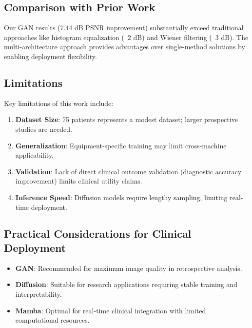 \documentclass[10pt,conference,letterpaper]{IEEEtran}
\begin{document}
\begin{itemize}
\subsection{Comparison with Prior Work}

Our GAN results (7.44 dB PSNR improvement) substantially exceed traditional approaches like histogram equalization (~2 dB) and Wiener filtering (~3 dB). The multi-architecture approach provides advantages over single-method solutions by enabling deployment flexibility.

\subsection{Limitations}

Key limitations of this work include:

\begin{enumerate}
  \item \textbf{Dataset Size}: 75 patients represents a modest dataset; larger prospective studies are needed.
  
  \item \textbf{Generalization}: Equipment-specific training may limit cross-machine applicability.
  
  \item \textbf{Validation}: Lack of direct clinical outcome validation (diagnostic accuracy improvement) limits clinical utility claims.
  
  \item \textbf{Inference Speed}: Diffusion models require lengthy sampling, limiting real-time deployment.
\end{enumerate}

\subsection{Practical Considerations for Clinical Deployment}

\begin{itemize}
  \item \textbf{GAN}: Recommended for maximum image quality in retrospective analysis.
  
  \item \textbf{Diffusion}: Suitable for research applications requiring stable training and interpretability.
  
  \item \textbf{Mamba}: Optimal for real-time clinical integration with limited computational resources.
\end{itemize}


\end{itemize}
\end{document}
